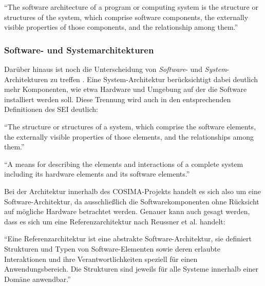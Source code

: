   \begin{definition}\label{def:architektur_bass_et_al}
    "`The software architecture of a program or computing system is the structure or structures of the system, which comprise software components, the externally visible properties of those components, and the relationship among them."' \emph{\citep[S. 21]{software_architecture_in_practice}}
  \end{definition}
  
  
\subsubsection{Software- und Systemarchitekturen} %
\label{ssub:software_und_systemarchitekturen}

  Darüber hinaus ist noch die Unterscheidung von \emph{Software}- und \emph{System}-Architekturen zu treffen \citep[S. xix]{evaluating_software_architectures}. Eine System-Architektur berücksichtigt dabei deutlich mehr Komponenten, wie etwa Hardware und Umgebung auf der die Software installiert werden soll. Diese Trennung wird auch in den entsprechenden Definitionen des SEI deutlich:
  
  \begin{definition}\label{def:software_architektur_sei}
    "`The structure or structures of a system, which comprise the software elements, the externally visible properties of those elements, and the relationships among them."' \emph{\citep{sei_glossary}}
  \end{definition}
  
  \begin{definition}\label{def:system_architektur}
    "`A means for describing the elements and interactions of a complete system including its hardware elements and its software elements."' \emph{\citep{sei_glossary}}
  \end{definition}

  Bei der Architektur innerhalb des COSIMA-Projekts handelt es sich also um eine Software-Architektur, da ausschließlich die Softwarekomponenten ohne Rücksicht auf mögliche Hardware betrachtet werden. Genauer kann auch gesagt werden, dass es sich um eine Referenzarchitektur nach Reussner et al. handelt:
  
  \begin{definition}[Referenzarchitektur]\label{def:referenzarchitektur}
    "`Eine Referenzarchitektur ist eine abstrakte Software-Architektur, sie definiert Strukturen und Typen von Software-Elementen sowie deren erlaubte Interaktionen und ihre Verantwortlichkeiten speziell für einen Anwendungsbereich. Die Strukturen sind jeweils für alle Systeme innerhalb einer Domäne anwendbar."' \emph{\citep[S. 358]{handbuch_der_software_architektur}}
  \end{definition}
  

